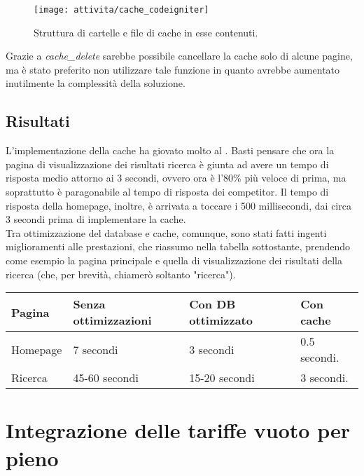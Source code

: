 \begin{figure}[!h] 
	\centering 
	\texttt{[image: attivita/cache\_codeigniter]} 
	\caption{Struttura di cartelle e file di cache in esse contenuti.}
\end{figure}
Grazie a \textit{cache\_delete} sarebbe possibile cancellare la cache solo di alcune pagine, ma è stato preferito non utilizzare tale funzione in quanto avrebbe aumentato inutilmente la complessità della soluzione.

\subsection{Risultati}
L'implementazione della cache ha giovato molto al \bookingEngine. Basti pensare che ora la pagina di visualizzazione dei risultati ricerca è giunta ad avere un tempo di risposta medio attorno ai 3 secondi, ovvero ora è l'80\% più veloce di prima, ma soprattutto è paragonabile al tempo di risposta dei competitor. Il tempo di risposta della homepage, inoltre, è arrivata a toccare i 500 millisecondi, dai circa 3 secondi prima di implementare la cache.\\
Tra ottimizzazione del database e cache, comunque, sono stati fatti ingenti miglioramenti alle prestazioni, che riassumo nella tabella sottostante, prendendo come esempio la pagina principale e quella di visualizzazione dei risultati della ricerca (che, per brevità, chiamerò soltanto "ricerca").\\

\begin{center}
	\def\arraystretch{1.5}
	\begin{tabular}{ | l | l | l | l |}
		\hline
		\textbf{Pagina} & \textbf{Senza ottimizzazioni} & \textbf{Con DB ottimizzato} & \textbf{Con cache} \\ \hline
		Homepage & 7 secondi & 3 secondi & 0.5 secondi.  \\
		\hline
		Ricerca & 45-60 secondi & 15-20 secondi & 3 secondi.  \\
		\hline
	\end{tabular}
\end{center}

\newpage
\section{Integrazione delle tariffe vuoto per pieno}
